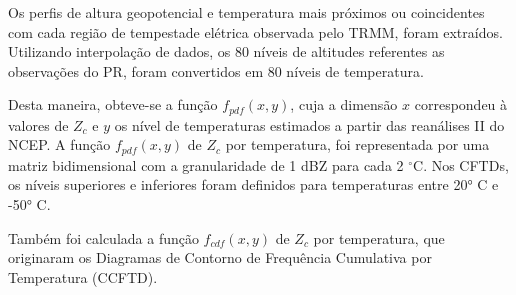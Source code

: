 Os perfis de altura geopotencial e temperatura mais próximos ou coincidentes com cada região de tempestade elétrica observada pelo TRMM, foram extraídos. Utilizando interpolação de dados, os 80 níveis de altitudes referentes as observações do PR, foram convertidos em 80 níveis de temperatura.

Desta maneira, obteve-se a função $f_{pdf}(x,y)$, cuja a dimensão $x$ correspondeu à valores de $Z_{c}$ e $y$ os nível de temperaturas estimados a partir das reanálises II do NCEP. A função $f_{pdf}(x,y)$ de $Z_c$ por temperatura, foi representada por uma matriz bidimensional com a granularidade de 1 dBZ para cada 2 $^{\circ}$C. Nos CFTDs, os níveis superiores e inferiores foram definidos para temperaturas entre 20° C e -50° C.


Também foi calculada a função $f_{cdf}(x,y)$ de $Z_c$ por temperatura, que originaram os Diagramas de Contorno de Frequência Cumulativa por Temperatura (CCFTD).     







